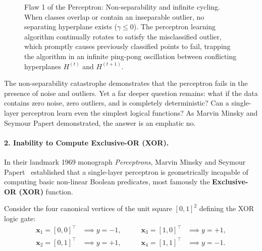\begin{figure}[H]
\caption{Flaw 1 of the Perceptron: Non-separability and infinite cycling. When classes overlap or contain an inseparable outlier, no separating hyperplane exists ($\gamma \le 0$). The perceptron learning algorithm continually rotates to satisfy the misclassified outlier, which promptly causes previously classified points to fail, trapping the algorithm in an infinite ping-pong oscillation between conflicting hyperplanes $H^{(t)}$ and $H^{(t+1)}$.}
\label{fig:perceptron_flaw_nonseparable}
\end{figure}

The non-separability catastrophe demonstrates that the perceptron fails in the presence of noise and outliers. Yet a far deeper question remains: what if the data contains zero noise, zero outliers, and is completely deterministic? Can a single-layer perceptron learn even the simplest logical functions? As Marvin Minsky and Seymour Papert demonstrated, the answer is an emphatic no.

\paragraph{2. Inability to Compute Exclusive-OR (XOR).}
In their landmark 1969 monograph \textit{Perceptrons}, Marvin Minsky and Seymour Papert~\cite{minsky1969perceptrons} established that a single-layer perceptron is geometrically incapable of computing basic non-linear Boolean predicates, most famously the \textbf{Exclusive-OR (XOR)} function.

Consider the four canonical vertices of the unit square $[0, 1]^2$ defining the XOR logic gate:
\begin{equation}
\begin{aligned}
\mathbf{x}_1 = [0, 0]^\top &\implies y = -1, \\
\mathbf{x}_2 = [0, 1]^\top &\implies y = +1,
\end{aligned}
\qquad
\begin{aligned}
\mathbf{x}_3 = [1, 0]^\top &\implies y = +1, \\
\mathbf{x}_4 = [1, 1]^\top &\implies y = -1.
\end{aligned}
\label{eq:xor_dataset}
\end{equation}

